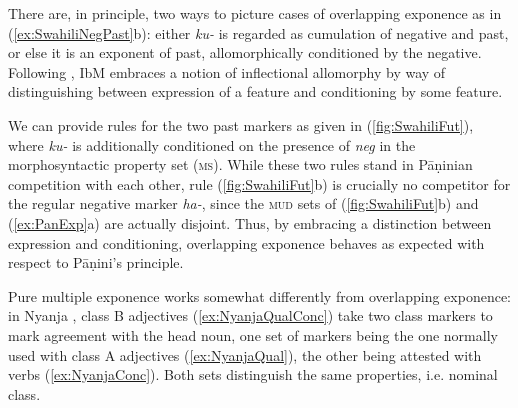 \documentclass[output=paper
	        ,collection
	        ,collectionchapter
 	        ,biblatex
                ,babelshorthands
                ,newtxmath
                ,draftmode
                ,colorlinks, citecolor=brown
]{langscibook}
\begin{document}
\begin{exe}
\begin{xlist}
\begin{exe}
\begin{xlist}
\begin{exe}
\end{exe}

There are, in principle, two ways to picture cases of overlapping
exponence as in (\ref{ex:SwahiliNegPast}b): either \textit{ku-} is
regarded as cumulation of negative and past, or else it is an exponent
of past, allomorphically conditioned by the negative.  Following
\citet{Carstairs87}, IbM embraces a notion of inflectional allomorphy
by way of distinguishing between expression of a feature and
conditioning by some feature.

\begin{exe}
  \ex \label{fig:SwahiliFut}
  \begin{xlist}
    \ex 
{}    \ex
{}
    
  \end{xlist}
\end{exe}

We can provide rules for the two past markers as given in
(\ref{fig:SwahiliFut}), where \textit{ku-} is additionally conditioned
on the presence of \textit{neg} in the morphosyntactic property set
(\textsc{ms}). While these two rules stand in Pāṇinian competition
with each other, rule (\ref{fig:SwahiliFut}b) is crucially no
competitor for the regular negative marker \textit{ha-}, since the
\textsc{mud} sets of (\ref{fig:SwahiliFut}b) and (\ref{ex:PanExp}a)
are actually disjoint. Thus, by embracing a distinction between
expression and conditioning, overlapping exponence behaves as expected
with respect to Pāṇini's principle.


Pure multiple exponence works somewhat differently from
overlapping exponence: in Nyanja \citep{Stump01,Crysmann:14:OUP},
class B adjectives (\ref{ex:NyanjaQualConc}) take two class markers to
mark agreement with the head noun, one set of markers being the one
normally used with class A adjectives (\ref{ex:NyanjaQual}), the other being attested with
verbs (\ref{ex:NyanjaConc}). Both sets distinguish the same
properties, i.e. nominal class. \label{Nyanja}


\end{xlist}
\end{exe}
\end{xlist}
\end{exe}
\end{document}
